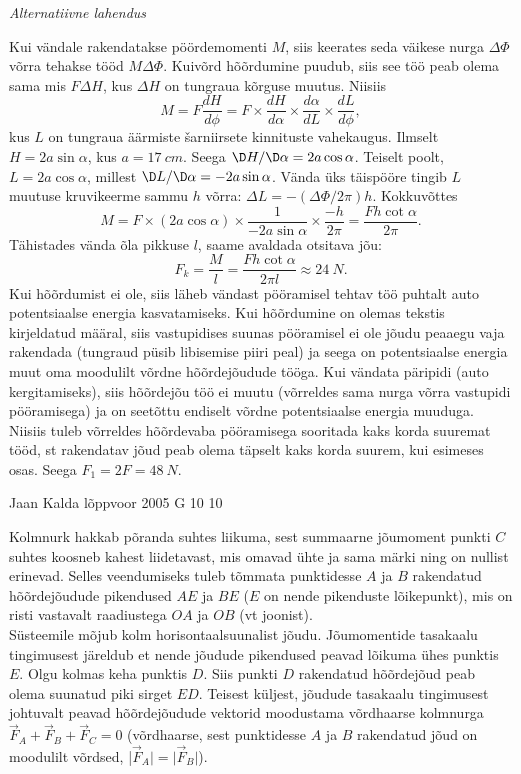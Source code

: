 \documentclass[11pt]{article}
\begin{document}
{{\vspace{0.5\baselineskip}

\emph{Alternatiivne lahendus}

Kui vändale rakendatakse pöördemomenti $M$, siis keerates seda
väikese nurga $\Delta\Phi$ võrra tehakse tööd $M\Delta\Phi$. Kuivõrd hõõrdumine puudub, siis see
töö peab olema sama mis $F\Delta H$, kus $\Delta H$ on tungraua kõrguse muutus. Niisiis
\[
M=F \frac{d H}{d \phi}=F \times \frac{d H}{d \alpha} \times \frac{d \alpha}{d L} \times \frac{d L}{d \phi},
\]
kus $L$ on tungraua äärmiste šarniirsete kinnituste vahekaugus. Ilmselt $H = 2a \sin\alpha$,
kus $a = \SI{17}{cm}$. Seega $\D H/\D\alpha = 2a \cos\alpha$. Teiselt poolt, $L = 2a \cos\alpha$, millest $\D L/\D\alpha =
-2a \sin\alpha$. Vända üks täispööre tingib $L$ muutuse kruvikeerme sammu $h$ võrra: $\Delta L =
-(\Delta\Phi/2\pi)h$. Kokkuvõttes
\[
M=F \times(2 a \cos \alpha) \times \frac{1}{-2 a \sin \alpha} \times \frac{-h}{2 \pi}=\frac{F h \cot \alpha}{2 \pi}.
\]
Tähistades vända õla pikkuse $l$, saame avaldada otsitava jõu:
\[
F_{k}=\frac{M}{l}=\frac{F h \cot \alpha}{2 \pi l} \approx \SI{24}{N}.
\]
\osa Kui hõõrdumist ei ole, siis läheb vändast pööramisel tehtav töö puhtalt auto
potentsiaalse energia kasvatamiseks. Kui hõõrdumine on olemas tekstis kirjeldatud
määral, siis vastupidises suunas pööramisel ei ole jõudu peaaegu vaja rakendada
(tungraud püsib libisemise piiri peal) ja seega on potentsiaalse energia muut oma
moodulilt võrdne hõõrdejõudude tööga. Kui vändata päripidi (auto kergitamiseks),
siis hõõrdejõu töö ei muutu (võrreldes sama nurga võrra vastupidi pööramisega) ja
on seetõttu endiselt võrdne potentsiaalse energia muuduga. Niisiis tuleb võrreldes
hõõrdevaba pööramisega sooritada kaks korda suuremat tööd, st rakendatav jõud
peab olema täpselt kaks korda suurem, kui esimeses osas. Seega $F_1 = 2F = \SI{48}{N}$.
\fi
}

{Jaan Kalda} %
{lõppvoor} %
{2005} %
{G 10} %
{10} %
{

\ifSolution
\osa Kolmnurk hakkab põranda suhtes liikuma, sest summaarne jõumoment punkti $C$ suhtes koosneb kahest liidetavast, mis omavad ühte ja sama märki ning on nullist erinevad. Selles veendumiseks tuleb tõmmata punktidesse $A$ ja $B$ rakendatud hõõrdejõudude pikendused $AE$ ja $BE$ ($E$ on nende pikenduste lõikepunkt), mis on risti vastavalt raadiustega $OA$ ja $OB$ (vt joonist).\\
\osa Süsteemile mõjub kolm horisontaalsuunalist jõudu. Jõumomentide tasakaalu tingimusest järeldub et nende jõudude pikendused peavad lõikuma ühes punktis $E$. Olgu kolmas keha punktis $D$. Siis punkti $D$ rakendatud hõõrdejõud peab olema suunatud piki sirget $ED$. Teisest küljest, jõudude tasakaalu tingimusest johtuvalt peavad hõõrdejõudude vektorid moodustama võrdhaarse kolmnurga $\vec F_A+\vec F_B+\vec F_C = 0$ (võrdhaarse, sest punktidesse $A$ ja $B$ rakendatud jõud on moodulilt võrdsed, |$\vec F_A| = |\vec F_B|$).

}}
\end{document}
